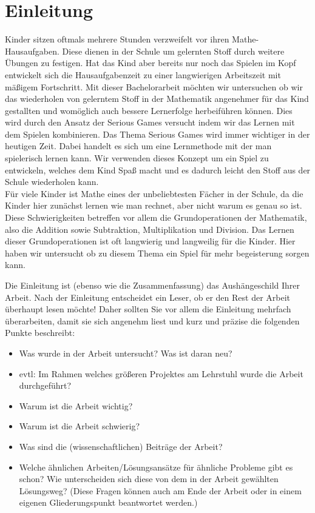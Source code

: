 
\chapter{Einleitung}
Kinder sitzen oftmals mehrere Stunden verzweifelt vor ihren Mathe-Hausaufgaben. Diese dienen in der Schule um gelernten Stoff durch weitere Übungen zu festigen. Hat das Kind aber bereits nur noch das Spielen im Kopf entwickelt sich die Hausaufgabenzeit zu einer langwierigen Arbeitszeit mit mäßigem Fortschritt. Mit dieser Bachelorarbeit möchten wir untersuchen ob wir das wiederholen von gelerntem Stoff in der Mathematik angenehmer für das Kind gestallten und womöglich auch bessere Lernerfolge herbeiführen können. Dies wird durch den Ansatz der Serious Games versucht indem wir das Lernen mit dem Spielen kombinieren. Das Thema Serious Games wird immer wichtiger in der heutigen Zeit. Dabei handelt es sich um eine Lernmethode mit der man spielerisch lernen kann. Wir verwenden dieses Konzept um ein Spiel zu entwickeln, welches dem Kind Spaß macht und es dadurch leicht den Stoff aus der Schule wiederholen kann.
\\
Für viele Kinder ist Mathe eines der unbeliebtesten Fächer in der Schule, da die Kinder hier zunächst lernen wie man rechnet, aber nicht warum es genau so ist. Diese Schwierigkeiten betreffen vor allem die Grundoperationen der Mathematik, also die Addition sowie Subtraktion, Multiplikation und Division. Das Lernen dieser Grundoperationen ist oft langwierig und langweilig für die Kinder. Hier haben wir untersucht ob zu diesem Thema ein Spiel für mehr begeisterung sorgen kann. 


Die Einleitung ist (ebenso wie die Zusammenfassung) das Aushängeschild Ihrer Arbeit. Nach der Einleitung entscheidet ein Leser, ob er den Rest der Arbeit überhaupt lesen möchte! Daher sollten Sie vor allem die Einleitung mehrfach überarbeiten, damit sie sich angenehm liest und kurz und präzise die folgenden Punkte beschreibt:
\begin{itemize}
  \item Was wurde in der Arbeit untersucht? Was ist daran neu?
  \item evtl: Im Rahmen welches größeren Projektes am Lehrstuhl wurde die Arbeit durchgeführt?
  \item Warum ist die Arbeit wichtig?
  \item Warum ist die Arbeit schwierig?
  \item Was sind die (wissenschaftlichen) Beiträge der Arbeit?
  \item Welche ähnlichen Arbeiten/Lösungsansätze für ähnliche Probleme gibt es schon? Wie unterscheiden sich diese von dem in der Arbeit gewählten Lösungsweg? (Diese Fragen können auch am Ende der Arbeit oder in einem eigenen Gliederungspunkt beantwortet werden.)
\end{itemize}

